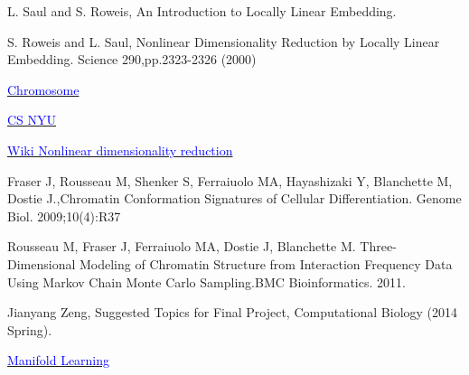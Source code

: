 \documentclass[12pt]{article} %
\begin{document}
\begin{thebibliography}{99} %

L. Saul and S. Roweis, An Introduction to Locally Linear Embedding.
 
S. Roweis and L. Saul, Nonlinear Dimensionality Reduction by Locally Linear Embedding. Science 290,pp.2323-2326 (2000)

\href{http://chromosome.sdsc.edu/mouse/hi-c/index.html}{\textcolor{blue}{Chromosome}}

\href{http://www.cs.nyu.edu/~roweis/lle/}{\textcolor{blue}{CS NYU}}

\href{http://en.wikipedia.org/wiki/Nonlinear_dimensionality_reduction}{\textcolor{blue}{Wiki Nonlinear dimensionality reduction}}

Fraser J, Rousseau M, Shenker S, Ferraiuolo MA, Hayashizaki Y, Blanchette M, Dostie J.,Chromatin Conformation Signatures of Cellular Differentiation. Genome Biol. 2009;10(4):R37

Rousseau M, Fraser J, Ferraiuolo MA, Dostie J, Blanchette M. Three-Dimensional Modeling of Chromatin Structure from Interaction Frequency Data Using Markov Chain Monte Carlo Sampling.BMC Bioinformatics. 2011.

Jianyang Zeng, Suggested Topics for Final Project, Computational Biology (2014 Spring).

\href{http://www.cse.wustl.edu/~kilian/research/manifold/manifold.html}{\textcolor{blue}{Manifold Learning}}

\end{thebibliography}

\end{document}
